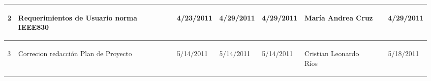 \begin{center}
\begin{longtable}{|p{}|p{}|p{}|p{}|p{}|p{}|p{}|p{}|}
{\begin{center} 2 \end{center}} & 
{\begin{center} Requerimientos de Usuario norma IEEE830 \end{center}} & 
{\begin{center} 4/23/2011 \end{center}} & 
{\begin{center} 4/29/2011 \end{center}} & 
{\begin{center} 4/29/2011 \end{center}} & 
{\begin{center} María Andrea Cruz \end{center}} & 
{\begin{center}  \end{center}} & 
{\begin{center} 4/29/2011 \end{center}}\\
\hline	


{\begin{center} 3 \end{center}} & 
{\begin{center} Correcion redacción Plan de Proyecto \end{center}} & 
{\begin{center} 5/14/2011 \end{center}} & 
{\begin{center} 5/14/2011 \end{center}} & 
{\begin{center} 5/14/2011 \end{center}} & 
{\begin{center} Cristian Leonardo Ríos \end{center}} & 
{\begin{center}  \end{center}} & 
{\begin{center} 5/18/2011 \end{center}}\\
\hline		


\end{longtable}
\end{center}
